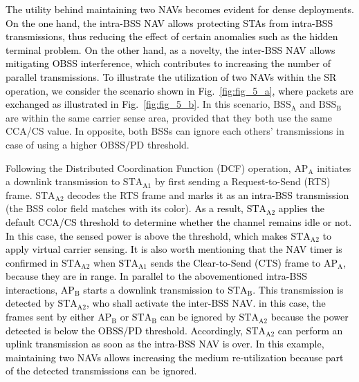 \documentclass{ieeeaccess}
\begin{document}
\textcolor{black}{The utility behind maintaining two NAVs becomes evident for dense deployments. On the one hand, the intra-BSS NAV allows protecting STAs from intra-BSS transmissions, thus reducing the effect of certain anomalies such as the hidden terminal problem. On the other hand, as a novelty, the inter-BSS NAV allows mitigating OBSS interference, which contributes to increasing the number of parallel transmissions. To illustrate the utilization of two NAVs within the SR operation, we consider the scenario shown in Fig.~\ref{fig:fig_5_a}, where packets are exchanged as illustrated in Fig.~\ref{fig:fig_5_b}.} In this scenario, $\text{BSS}_\text{A}$ and $\text{BSS}_\text{B}$ are within the same carrier sense area, provided that they both use the same CCA/CS value. In opposite, both BSSs can ignore each others' transmissions in case of using a higher OBSS/PD threshold.

Following the Distributed Coordination Function (DCF) operation, $\text{AP}_\text{A}$ initiates a downlink transmission to $\text{STA}_\text{A1}$ by first sending a Request-to-Send (RTS) frame. $\text{STA}_\text{A2}$ decodes the RTS frame and \textcolor{black}{marks it as an intra-BSS transmission} (the BSS color field matches with its color). \textcolor{black}{As a result, $\text{STA}_\text{A2}$ applies the default CCA/CS threshold to determine whether the channel remains idle or not. In this case, the sensed power is above the threshold, which makes $\text{STA}_\text{A2}$ to apply virtual carrier sensing. It is also worth mentioning that the NAV timer is confirmed in $\text{STA}_\text{A2}$ when $\text{STA}_\text{A1}$ sends the Clear-to-Send (CTS) frame to $\text{AP}_\text{A}$, because they are in range. In parallel to the abovementioned intra-BSS interactions, $\text{AP}_\text{B}$ starts a downlink transmission to $\text{STA}_\text{B}$. This transmission is detected by $\text{STA}_\text{A2}$, who shall activate the inter-BSS NAV. in this case, the frames sent by either $\text{AP}_\text{B}$ or $\text{STA}_\text{B}$ can be ignored by $\text{STA}_\text{A2}$ because the power detected is below the OBSS/PD threshold. Accordingly, $\text{STA}_\text{A2}$ can perform an uplink transmission as soon as the intra-BSS NAV is over. In this example, maintaining two NAVs allows increasing the medium re-utilization because part of the detected transmissions can be ignored.}

\end{document}
